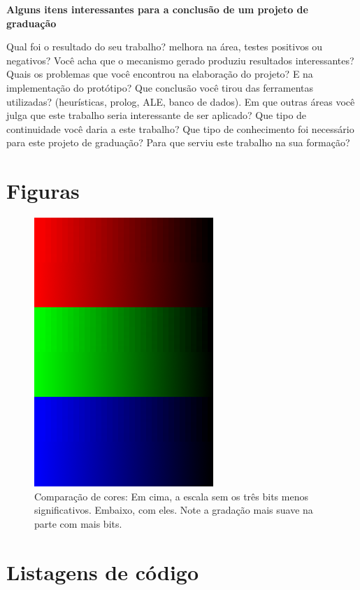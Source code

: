 \documentclass[brazil]{abnt}
\begin{document}
{\bf Alguns itens interessantes para a conclusão de um projeto de graduação}

Qual foi o resultado do seu trabalho? melhora na área, testes positivos ou negativos?
Você acha que o mecanismo gerado produziu resultados interessantes?
Quais os problemas que você encontrou na elaboração do projeto?
E na implementação do protótipo?
Que conclusão você tirou das ferramentas utilizadas? (heurísticas, prolog, ALE, banco de dados).
Em que outras áreas você julga que este trabalho seria interessante de ser aplicado?
Que tipo de continuidade você daria a este trabalho?
Que tipo de conhecimento foi necessário para este projeto de graduação?
Para que serviu este trabalho na sua formação?






\anexo

\chapter{Figuras}

\begin{figure}[h]
\centering
\includegraphics{imgs/diferenca_cor.png}
\caption[Comparação de cores]{Comparação de cores: Em cima, a escala sem os três bits menos significativos. Embaixo, com eles. Note a gradação mais suave na parte com mais bits.}
\label{img:comparacao} 
\end{figure}

\chapter{Listagens de código}
\end{document}
